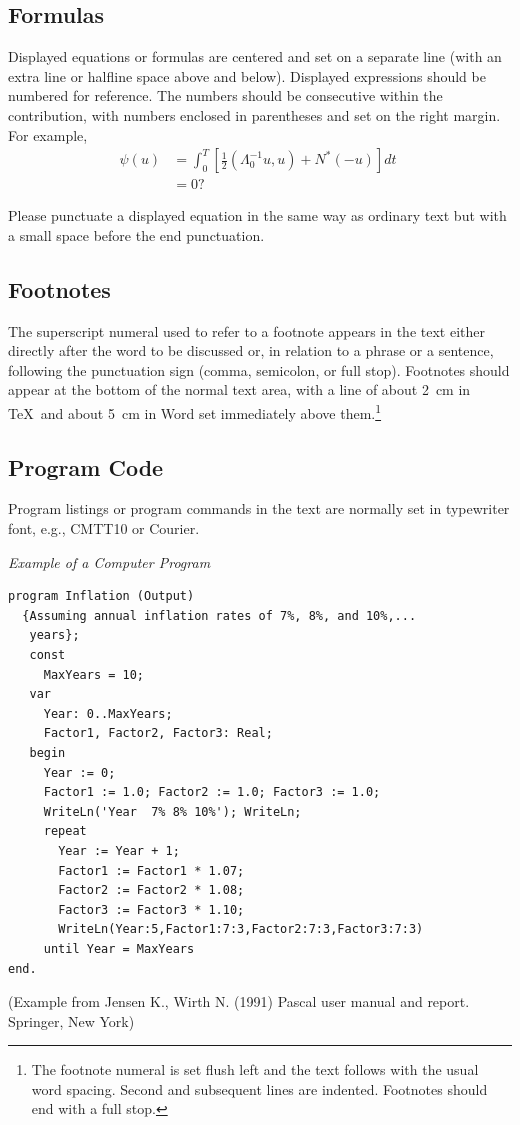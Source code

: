 \documentclass[runningheads]{llncs}
\begin{document}
\subsection{Formulas}

Displayed equations or formulas are centered and set on a separate
line (with an extra line or halfline space above and below). Displayed
expressions should be numbered for reference. The numbers should be
consecutive within the contribution,
with numbers enclosed in parentheses and set on the right margin.
For example,
\begin{align}
  \psi (u) & = \int_{0}^{T} \left[\frac{1}{2}
  \left(\Lambda_{0}^{-1} u,u\right) + N^{\ast} (-u)\right] dt \; \\
& = 0 ?
\end{align}

Please punctuate a displayed equation in the same way as ordinary
text but with a small space before the end punctuation.

\subsection{Footnotes}

The superscript numeral used to refer to a footnote appears in the text
either directly after the word to be discussed or, in relation to a
phrase or a sentence, following the punctuation sign (comma,
semicolon, or full stop). Footnotes should appear at the bottom of
the
normal text area, with a line of about 2~cm in \TeX\ and about 5~cm in
Word set
immediately above them.\footnote{The footnote numeral is set flush left
and the text follows with the usual word spacing. Second and subsequent
lines are indented. Footnotes should end with a full stop.}


\subsection{Program Code}

Program listings or program commands in the text are normally set in
typewriter font, e.g., CMTT10 or Courier.

\noindent
{\it Example of a Computer Program}
\begin{verbatim}
program Inflation (Output)
  {Assuming annual inflation rates of 7%, 8%, and 10%,...
   years};
   const
     MaxYears = 10;
   var
     Year: 0..MaxYears;
     Factor1, Factor2, Factor3: Real;
   begin
     Year := 0;
     Factor1 := 1.0; Factor2 := 1.0; Factor3 := 1.0;
     WriteLn('Year  7% 8% 10%'); WriteLn;
     repeat
       Year := Year + 1;
       Factor1 := Factor1 * 1.07;
       Factor2 := Factor2 * 1.08;
       Factor3 := Factor3 * 1.10;
       WriteLn(Year:5,Factor1:7:3,Factor2:7:3,Factor3:7:3)
     until Year = MaxYears
end.
\end{verbatim}
%
\noindent
{\small (Example from Jensen K., Wirth N. (1991) Pascal user manual and
report. Springer, New York)}
\end{document}
